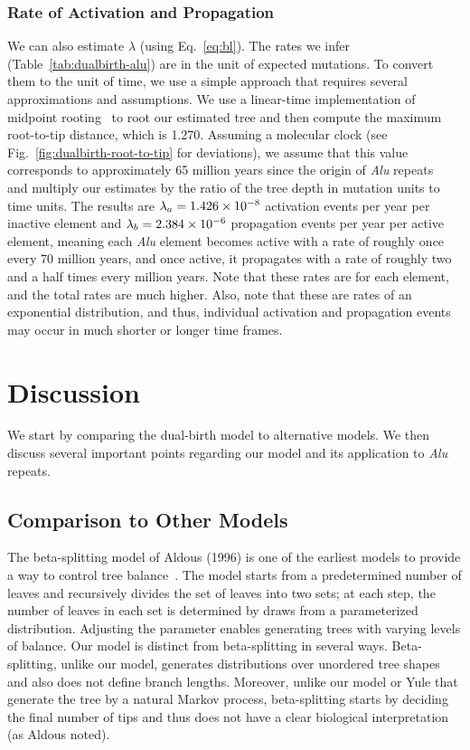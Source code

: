 \subsubsection{Rate of Activation and Propagation}
We can also estimate $\lambda$ (using Eq.~\ref{eq:bl}). The rates we infer (Table~\ref{tab:dualbirth-alu}) are in the unit of expected mutations. To convert them to the unit of time, we use a simple approach that requires several approximations and assumptions. We use a linear-time implementation of midpoint rooting~\cite{Mai2017} to root our estimated tree and then compute the maximum root-to-tip distance, which is 1.270. Assuming a molecular clock (see Fig.~\ref{fig:dualbirth-root-to-tip} for deviations), we assume that this value corresponds to approximately 65 million years since the origin of {\em Alu} repeats~\cite{Batzer2002} and multiply our estimates by the ratio of the tree depth in mutation units to time units. The results are $\lambda_a=1.426\times10^{-8}$ activation events per year per inactive element and $\lambda_b=2.384\times10^{-6}$ propagation events per year per active element, meaning each {\em Alu} element becomes active with a rate of roughly once every 70 million years, and once active, it propagates with a rate of roughly two and a half times every million years. Note that these rates are for each element, and the total rates are much higher. Also, note that these are rates of an exponential distribution, and thus, individual activation and propagation events may occur in much shorter or longer time frames.

\section{Discussion}
We start by comparing the dual-birth model to alternative models. We then discuss several important points regarding our model and its application to {\em Alu} repeats. 

\subsection{Comparison to Other Models}
The beta-splitting model of Aldous (1996) is one of the earliest models to provide a way to control tree balance~\cite{Aldous1996}. The model starts from a predetermined number of leaves and recursively divides the set of leaves into two sets; at each step, the number of leaves in each set is determined by draws from a parameterized distribution. Adjusting the parameter enables generating trees with varying levels of balance. Our model is distinct from beta-splitting in several ways. Beta-splitting, unlike our model, generates distributions over unordered tree shapes and also does not define branch lengths. Moreover, unlike our model or Yule that generate the tree by a natural Markov process, beta-splitting starts by deciding the final number of tips and thus does not have a clear biological interpretation (as Aldous noted).

